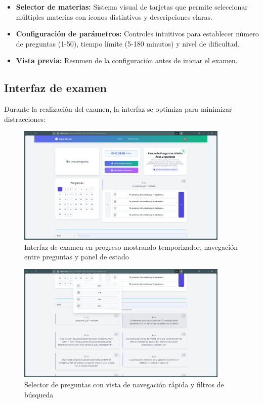 \documentclass[12pt,a4paper]{report}
\begin{document}
\begin{itemize}
\item \textbf{Selector de materias:} Sistema visual de tarjetas que permite seleccionar múltiples materias con iconos distintivos y descripciones claras.
\item \textbf{Configuración de parámetros:} Controles intuitivos para establecer número de preguntas (1-50), tiempo límite (5-180 minutos) y nivel de dificultad.
\item \textbf{Vista previa:} Resumen de la configuración antes de iniciar el examen.
\end{itemize}

\subsection{Interfaz de examen}

Durante la realización del examen, la interfaz se optimiza para minimizar distracciones:

\begin{figure}[h]
\centering
\includegraphics[width=0.9\textwidth]{assets/250617_06h47m02s_screenshot.png}
\caption{Interfaz de examen en progreso mostrando temporizador, navegación entre preguntas y panel de estado}
\label{fig:examen-progreso}
\end{figure}

\begin{figure}[h]
\centering
\includegraphics[width=0.9\textwidth]{assets/250617_06h47m26s_screenshot.png}
\caption{Selector de preguntas con vista de navegación rápida y filtros de búsqueda}
\label{fig:navegacion-preguntas}
\end{figure}
\end{document}
